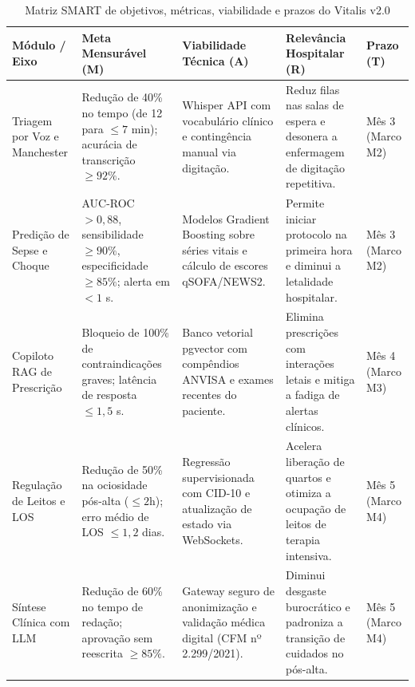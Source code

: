 \begin{table}[!htbp]
\centering
\small
\setlength{\tabcolsep}{4.5pt}
\caption{Matriz SMART de objetivos, métricas, viabilidade e prazos do Vitalis v2.0}
\label{tab:matriz_smart}
\begin{tabularx}{\textwidth}{>{\raggedright\arraybackslash}p{2.3cm} >{\raggedright\arraybackslash}p{2.9cm} >{\raggedright\arraybackslash}p{2.9cm} >{\raggedright\arraybackslash}X >{\raggedright\arraybackslash}p{1.8cm}}
\toprule
\textbf{Módulo / Eixo} & \textbf{Meta Mensurável (M)} & \textbf{Viabilidade Técnica (A)} & \textbf{Relevância Hospitalar (R)} & \textbf{Prazo (T)} \\
\midrule
Triagem por Voz e Manchester &
Redução de 40\% no tempo (de 12 para $\le 7$ min); acurácia de transcrição $\ge 92\%$. &
Whisper API com vocabulário clínico e contingência manual via digitação. &
Reduz filas nas salas de espera e desonera a enfermagem de digitação repetitiva. &
Mês 3 \newline (Marco M2) \\
\addlinespace
Predição de Sepse e Choque &
AUC-ROC $> 0{,}88$, sensibilidade $\ge 90\%$, especificidade $\ge 85\%$; alerta em $< 1$ s. &
Modelos Gradient Boosting sobre séries vitais e cálculo de escores qSOFA/NEWS2. &
Permite iniciar protocolo na primeira hora e diminui a letalidade hospitalar. &
Mês 3 \newline (Marco M2) \\
\addlinespace
Copiloto RAG de Prescrição &
Bloqueio de 100\% de contraindicações graves; latência de resposta $\le 1{,}5$ s. &
Banco vetorial pgvector com compêndios ANVISA e exames recentes do paciente. &
Elimina prescrições com interações letais e mitiga a fadiga de alertas clínicos. &
Mês 4 \newline (Marco M3) \\
\addlinespace
Regulação de Leitos e LOS &
Redução de 50\% na ociosidade pós-alta ($\le 2$h); erro médio de LOS $\le 1{,}2$ dias. &
Regressão supervisionada com CID-10 e atualização de estado via WebSockets. &
Acelera liberação de quartos e otimiza a ocupação de leitos de terapia intensiva. &
Mês 5 \newline (Marco M4) \\
\addlinespace
Síntese Clínica com LLM &
Redução de 60\% no tempo de redação; aprovação sem reescrita $\ge 85\%$. &
Gateway seguro de anonimização e validação médica digital (CFM nº 2.299/2021). &
Diminui desgaste burocrático e padroniza a transição de cuidados no pós-alta. &
Mês 5 \newline (Marco M4) \\

\end{tabularx}
\end{table}
